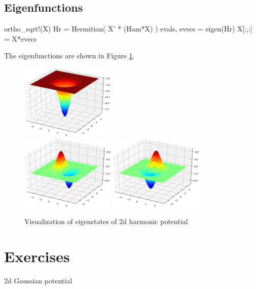 \subsection{Eigenfunctions}

\begin{juliacode}
ortho_sqrt!(X)
Hr = Hermitian( X' * (Ham*X) )
evals, evecs = eigen(Hr)
X[:,:] = X*evecs
\end{juliacode}

The eigenfunctions are shown in Figure \ref{fig:harm_2d_eigenfunctions}.

\begin{fullwidth}
\begin{figure}[h]
{\centering
\includegraphics[width=0.4\textwidth]{../codes/sch_2d/IMG_harmonic_psi_1.pdf}\\
\includegraphics[width=0.4\textwidth]{../codes/sch_2d/IMG_harmonic_psi_2.pdf}%
\includegraphics[width=0.4\textwidth]{../codes/sch_2d/IMG_harmonic_psi_3.pdf}
\par}
\caption{Visualization of eigenstates of 2d harmonic potential}
\label{fig:harm_2d_eigenfunctions}
\end{figure}
\end{fullwidth}

\section{Exercises}

2d Gaussian potential